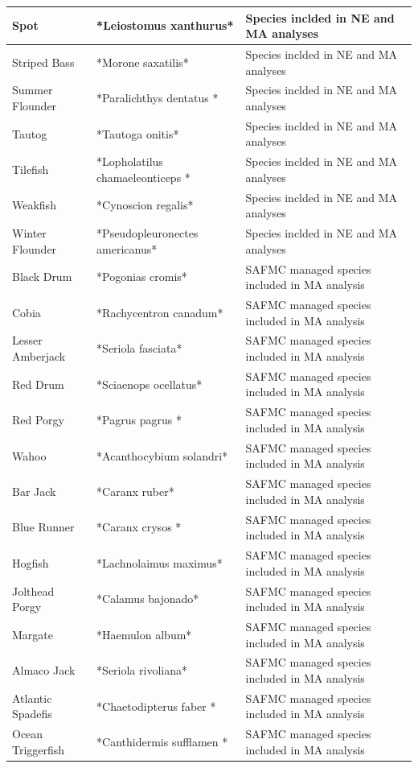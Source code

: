 \documentclass[
]{book}
\begin{document}
\begin{table}
\begin{tabular}[t]{l|l|l}
\hline
Spot & *Leiostomus xanthurus* & Species inclded in NE and MA analyses\\
\hline
Striped Bass & *Morone saxatilis* & Species inclded in NE and MA analyses\\
\hline
Summer Flounder & *Paralichthys dentatus * & Species inclded in NE and MA analyses\\
\hline
Tautog & *Tautoga onitis* & Species inclded in NE and MA analyses\\
\hline
Tilefish & *Lopholatilus chamaeleonticeps * & Species inclded in NE and MA analyses\\
\hline
Weakfish & *Cynoscion regalis* & Species inclded in NE and MA analyses\\
\hline
Winter Flounder & *Pseudopleuronectes americanus* & Species inclded in NE and MA analyses\\
\hline
Black Drum & *Pogonias cromis* & SAFMC managed species included in MA analysis\\
\hline
Cobia & *Rachycentron canadum* & SAFMC managed species included in MA analysis\\
\hline
Lesser Amberjack & *Seriola fasciata* & SAFMC managed species included in MA analysis\\
\hline
Red Drum & *Sciaenops ocellatus* & SAFMC managed species included in MA analysis\\
\hline
Red Porgy & *Pagrus pagrus * & SAFMC managed species included in MA analysis\\
\hline
Wahoo & *Acanthocybium solandri* & SAFMC managed species included in MA analysis\\
\hline
Bar Jack & *Caranx ruber* & SAFMC managed species included in MA analysis\\
\hline
Blue Runner & *Caranx crysos * & SAFMC managed species included in MA analysis\\
\hline
Hogfish & *Lachnolaimus maximus* & SAFMC managed species included in MA analysis\\
\hline
Jolthead Porgy & *Calamus bajonado* & SAFMC managed species included in MA analysis\\
\hline
Margate & *Haemulon album* & SAFMC managed species included in MA analysis\\
\hline
Almaco Jack & *Seriola rivoliana* & SAFMC managed species included in MA analysis\\
\hline
Atlantic Spadefis & *Chaetodipterus faber * & SAFMC managed species included in MA analysis\\
\hline
Ocean Triggerfish & *Canthidermis sufflamen * & SAFMC managed species included in MA analysis\\

\end{tabular}
\end{table}
\end{document}
